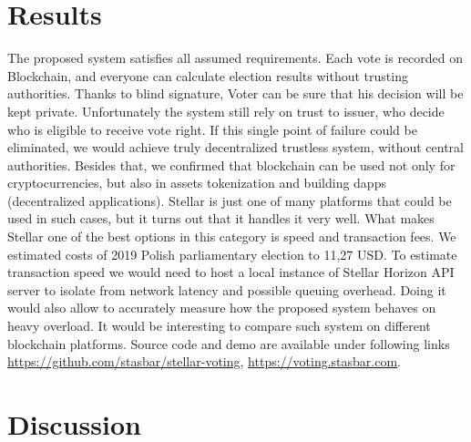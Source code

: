 \documentclass[runningheads]{llncs}
\begin{document}
\section{Results}
The proposed system satisfies all assumed requirements. Each vote is recorded on Blockchain, and everyone can calculate election results without trusting authorities. Thanks to blind signature, Voter can be sure that his decision will be kept private. Unfortunately the system still rely on trust to issuer, who decide who is eligible to receive vote right. If this single point of failure could be eliminated, we would achieve truly decentralized trustless system, without central authorities.
Besides that, we confirmed that blockchain can be used not only for cryptocurrencies, but also in assets tokenization and building dapps (decentralized applications). Stellar is just one of many platforms that could be used in such cases, but it turns out that it handles it very well. What makes Stellar one of the best options in this category is speed and transaction fees. We estimated costs of 2019 Polish parliamentary election to 11,27 USD. To estimate transaction speed we would need to host a local instance of Stellar Horizon API server to isolate from network latency and possible queuing overhead. Doing it would also allow to accurately measure how the proposed system behaves on heavy overload. It would be interesting to compare such system on different blockchain platforms. Source code and demo are available under following links \url{https://github.com/stasbar/stellar-voting}, \url{https://voting.stasbar.com}.

\section{Discussion}



\end{document}
